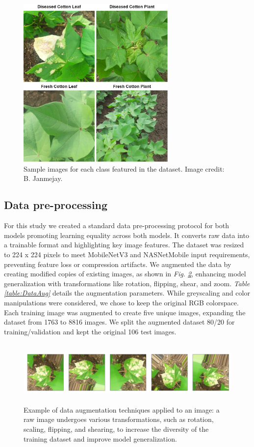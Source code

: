\documentclass[conference]{IEEEtran}
\begin{document}
\begin{figure}[h]
\centerline{\includegraphics[height=8.5cm, width=.9\linewidth]{Images/cotton images.drawio.png}}
\caption{Sample images for each class featured in the dataset. Image credit: B. Janmejay.}
\label{CottonImages}
\end{figure}

\subsection{Data pre-processing}

For this study we created a standard data pre-processing protocol for both models promoting learning equality across both models. It converts raw data into a trainable format and highlighting key image features. The dataset was resized to 224 x 224 pixels to meet MobileNetV3 and NASNetMobile input requirements, preventing feature loss or compression artifacts. We augmented the data by creating modified copies of existing images, as shown in \emph{Fig. \ref{Augment}}, enhancing model generalization with transformations like rotation, flipping, shear, and zoom. \emph{Table \ref{table:DataAug}} details the augmentation parameters. While greyscaling and color manipulations were considered, we chose to keep the original RGB colorspace. Each training image was augmented to create five unique images, expanding the dataset from 1763 to 8816 images. We split the augmented dataset 80/20 for training/validation and kept the original 106 test images.
 
\begin{figure}[ht]
\centering
\includegraphics[height=3.2cm, width=1\linewidth]{Images/Data_Augmentation5.png}
\caption{Example of data augmentation techniques applied to an image: a raw image undergoes various transformations, such as rotation, scaling, flipping, and shearing, to increase the diversity of the training dataset and improve model generalization.}
\label{Augment}
\end{figure}
\end{document}

